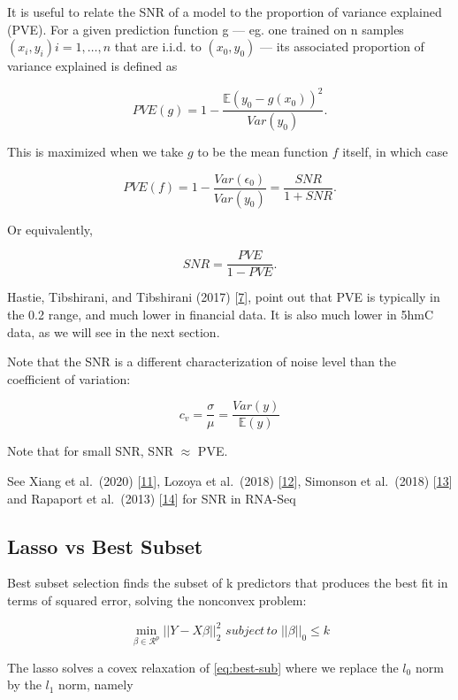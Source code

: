 \documentclass[
]{book}
\begin{document}
It is useful to relate the SNR of a model to the proportion of variance explained (PVE).
For a given prediction function g --- eg. one trained on n samples
\((x_i, y_i) i = 1, \dots, n\) that are i.i.d. to \((x_0, y_0)\) --- its
associated proportion of variance explained is defined as

\[PVE(g)=1 - \frac{\mathbb{E}(y_0-g(x_0))^2}{Var(y_0)}.\]

This is maximized when we take \(g\) to be the mean function \(f\) itself,
in which case

\[PVE(f) = 1 - \frac{Var(\epsilon_0)}{Var(y_0)} = \frac{SNR}{1+SNR}.\]

Or equivalently,

\[SNR = \frac{PVE}{1-PVE}.\]

Hastie, Tibshirani, and Tibshirani (2017) {[}\protect\hyperlink{ref-Hastie:2017aa}{7}{]}, point out that
PVE is typically in the 0.2 range, and much lower in financial data. It
is also much lower in 5hmC data, as we will see in the next section.

Note that the SNR is a different characterization of noise level than the
coefficient of variation:

\[c_v = \frac{\sigma}{\mu}=\frac{Var(y)}{\mathbb{E}(y)}\]

Note that for small SNR, SNR \(\approx\) PVE.

See Xiang et al.~(2020) {[}\protect\hyperlink{ref-Xiang:2020aa}{11}{]}, Lozoya et al.~(2018) {[}\protect\hyperlink{ref-Lozoya:2018aa}{12}{]},
Simonson et al.~(2018) {[}\protect\hyperlink{ref-Simonsen:2018aa}{13}{]} and
Rapaport et al.~(2013) {[}\protect\hyperlink{ref-Rapaport:2013aa}{14}{]} for SNR in RNA-Seq

\hypertarget{lasso-vs-best-subset}{%
\subsection*{Lasso vs Best Subset}\label{lasso-vs-best-subset}}

Best subset selection finds the subset of k predictors that
produces the best fit in terms of squared error, solving the nonconvex problem:

\begin{equation}
 \min_{\beta \in \mathcal{R}^p} ||Y - X\beta||^2_2 \, \, subject \, to \, \, ||\beta||_0 \leq k
 \label{eq:best-sub}
\end{equation}

The lasso solves a covex relaxation of \eqref{eq:best-sub} where we replace the
\(l_0\) norm by the \(l_1\) norm, namely
\end{document}
